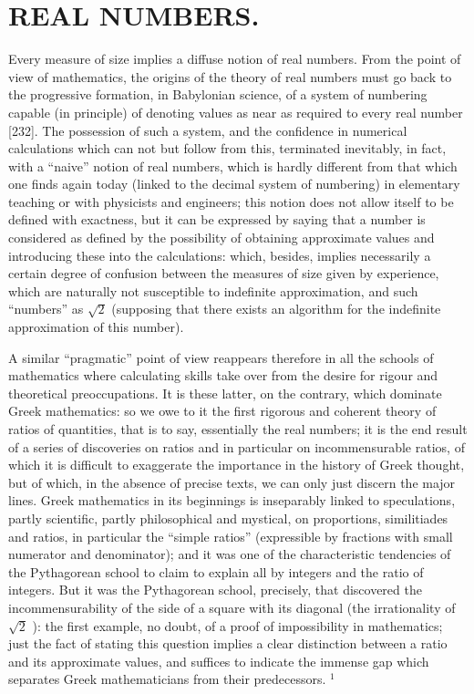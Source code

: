 \chapter{REAL NUMBERS.}

Every measure of size implies a diffuse notion of real numbers. From the point of view of mathematics, the origins of the theory of real numbers must go back to the progressive formation, in Babylonian science, of a system of numbering capable (in principle) of denoting values as near as required to every real number {[}232{]}. The possession of such a system, and the confidence in numerical calculations which can not but follow from this, terminated inevitably, in fact, with a ``naive'' notion of real numbers, which is hardly different from that which one finds again today (linked to the decimal system of numbering) in elementary teaching or with physicists and engineers; this notion does not allow itself to be defined with exactness, but it can be expressed by saying that a number is considered as defined by the possibility of obtaining approximate values and introducing these into the calculations: which, besides, implies necessarily a certain degree of confusion between the measures of size given by experience, which are naturally not susceptible to indefinite approximation, and such ``numbers'' as \(\sqrt{2}\) (supposing that there exists an algorithm for the indefinite approximation of this number).

A similar ``pragmatic'' point of view reappears therefore in all the schools of mathematics where calculating skills take over from the desire for rigour and theoretical preoccupations. It is these latter, on the contrary, which dominate Greek mathematics: so we owe to it the first rigorous and coherent theory of ratios of quantities, that is to say, essentially the real numbers; it is the end result of a series of discoveries on ratios and in particular on incommensurable ratios, of which it is difficult to exaggerate the importance in the history of Greek thought, but of which, in the absence of precise texts, we can only just discern the major lines. Greek mathematics in its beginnings is inseparably linked to speculations, partly scientific, partly philosophical and mystical, on proportions, similitiades and ratios, in particular the ``simple ratios'' (expressible by fractions with small numerator and denominator); and it was one of the characteristic tendencies of the Pythagorean school to claim to explain all by integers and the ratio of integers. But it was the Pythagorean school, precisely, that discovered the incommensurability of the side of a square with its diagonal (the irrationality of \(\sqrt{2}\) ): the first example, no doubt, of a proof of impossibility in mathematics; just the fact of stating this question implies a clear distinction between a ratio and its approximate values, and suffices to indicate the immense gap which separates Greek mathematicians from their predecessors. \(^{1}\)

